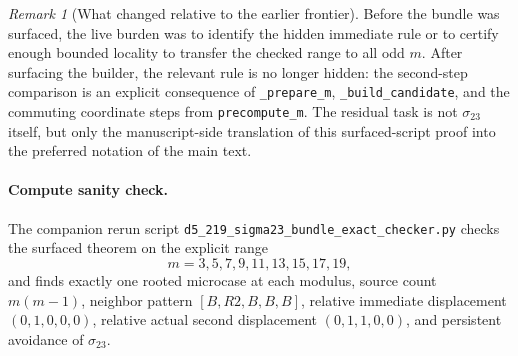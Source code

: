 \documentclass[11pt]{article}
\theoremstyle{remark}
\newtheorem{remark}{Remark}
\begin{document}
\begin{remark}[What changed relative to the earlier frontier]
Before the bundle was surfaced, the live burden was to identify the hidden immediate rule or to certify enough
bounded locality to transfer the checked range to all odd \(m\).  After surfacing the builder, the relevant rule is
no longer hidden: the second-step comparison is an explicit consequence of \texttt{\_prepare\_m},
\texttt{\_build\_candidate}, and the commuting coordinate steps from \texttt{precompute\_m}.  The residual task is
not \(\sigma_{23}\) itself, but only the manuscript-side translation of this surfaced-script proof into the preferred
notation of the main text.
\end{remark}

\paragraph{Compute sanity check.}
The companion rerun script \texttt{d5\_219\_sigma23\_bundle\_exact\_checker.py} checks the surfaced theorem on the explicit
range
\[
m=3,5,7,9,11,13,15,17,19,
\]
and finds exactly one rooted microcase at each modulus, source count \(m(m-1)\), neighbor pattern
\([B,R2,B,B,B]\), relative immediate displacement \((0,1,0,0,0)\), relative actual second displacement
\((0,1,1,0,0)\), and persistent avoidance of \(\sigma_{23}\).
\end{document}
